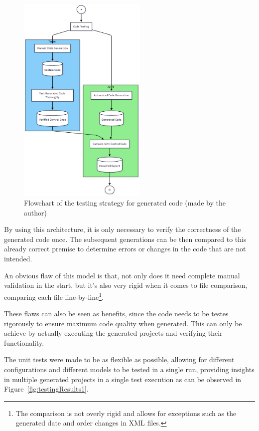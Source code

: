 \begin{figure}[htbp]
	\centering
	\includegraphics[width=0.55\textwidth]{testingFlowchart.png}
	\caption{Flowchart of the testing strategy for generated code (made by the author)}
	\label{fig:testingFlowchart}
\end{figure}

By using this architecture, it is only necessary to verify the correctness of the generated code once. The subsequent generations can be then compared to this already correct premise to determine errors or changes in the code that are not intended.

An obvious flaw of this model is that, not only does it need complete manual validation in the start, but it's also very rigid when it comes to file comparison, comparing each file line-by-line\footnote{The comparison is not overly rigid and allows for exceptions such as the generated date and order changes in \gls{XML} files.}.

These flaws can also be seen as benefits, since the code needs to be testes rigorously to ensure maximum code quality when generated. This can only be achieve by actually executing the generated projects and verifying their functionality.

The unit tests were made to be as flexible as possible, allowing for different configurations and different models to be tested in a single run, providing insights in multiple generated projects in a single test execution as can be observed in Figure~\ref{fig:testingResults1}.

